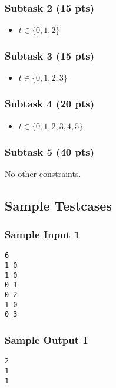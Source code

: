 \subsubsection{Subtask 2 (15 pts)}\label{subtask-2}
\begin{itemize}
\item $t\in \{0, 1, 2\}$
\end{itemize}

\subsubsection{Subtask 3 (15 pts)}\label{subtask-3}
\begin{itemize}
\item $t\in \{0, 1, 2, 3\}$
\end{itemize}

\subsubsection{Subtask 4 (20 pts)}\label{subtask-4}
\begin{itemize}
\item $t\in \{0, 1, 2, 3, 4, 5\}$
\end{itemize}

\subsubsection{Subtask 5 (40 pts)}\label{subtask-5}

No other constraints.

\subsection{Sample Testcases}\label{sample-testcases}

\begin{multicols}{2}
\subsubsection{Sample Input 1}\label{sample-input-1}
\begin{verbatim}
6
1 0
1 0
0 1
0 2
1 0
0 3
\end{verbatim}

\columnbreak

\subsubsection{Sample Output 1}\label{sample-output-1}
\begin{verbatim}
2
1
1
\end{verbatim}
\end{multicols}

